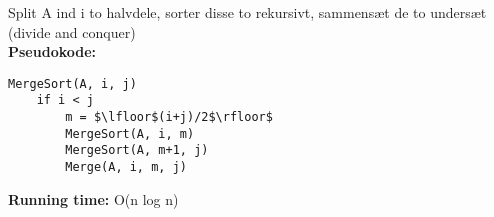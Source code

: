 Split A ind i to halvdele, sorter disse to rekursivt, sammensæt de to undersæt (divide and conquer)\\
\textbf{Pseudokode:}
\begin{lstlisting}[frame=single, mathescape=true]
MergeSort(A, i, j)
	if i < j
		m = $\lfloor$(i+j)/2$\rfloor$
		MergeSort(A, i, m)
		MergeSort(A, m+1, j)
		Merge(A, i, m, j)
\end{lstlisting}
\textbf{Running time:} O(n log n)
